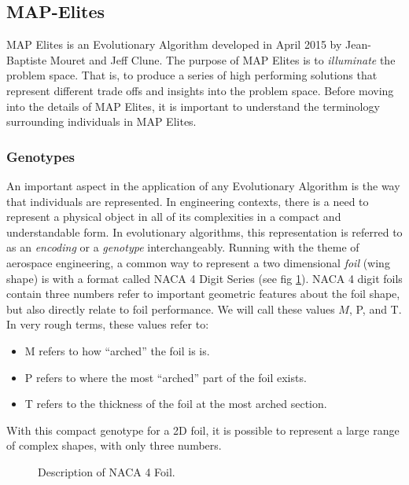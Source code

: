 \documentclass{sig-alternate}
\begin{document}
\subsection{MAP-Elites}
\label{sec:MAP-Elites}

MAP Elites is an Evolutionary Algorithm developed in April 2015 by Jean-Baptiste Mouret and Jeff Clune.
The purpose of MAP Elites is to \textit{illuminate} the problem space.
That is, to produce a series of high performing solutions that represent different trade offs and insights into the problem space.
Before moving into the details of MAP Elites, it is important to understand the terminology surrounding individuals in MAP Elites.

\subsubsection{Genotypes}
\label{sec:genotypes}

An important aspect in the application of any Evolutionary Algorithm is the way that individuals are represented.
In engineering contexts, there is a need to represent a physical object in all of its complexities in a compact and understandable form.
In evolutionary algorithms, this representation is referred to as an \textit{encoding} or a \textit{genotype} interchangeably.
Running with the theme of aerospace engineering, a common way to represent a two dimensional \textit{foil} (wing shape) is with a format called NACA 4 Digit Series \cite{wiki:NACAairfoil}(see fig \ref{fig:NACA4}).
NACA 4 digit foils contain three numbers refer to important geometric features about the foil shape, but also directly relate to foil performance.
We will call these values $M$, P, and T. In very rough terms, these values refer to:
\begin{itemize}
  \item M refers to how ``arched'' the foil is is.
  \item P refers to where the most ``arched'' part of the foil exists.
  \item T refers to the thickness of the foil at the most arched section.
\end{itemize}
With this compact genotype for a 2D foil, it is possible to represent a large range of complex shapes, with only three numbers.
\begin{figure}[!h]
\centering
{}
\caption{Description of NACA 4 Foil.}
\label{fig:NACA4}
\end{figure}
\end{document}
